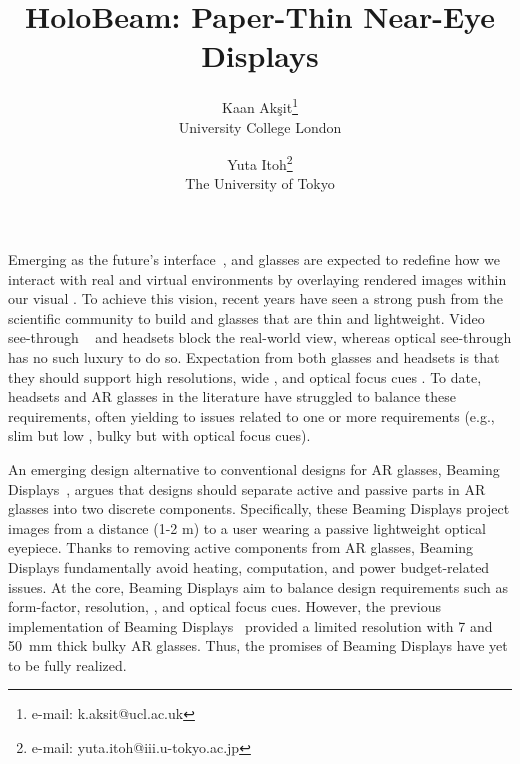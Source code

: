 \documentclass{vgtc}                          %
\title{HoloBeam: Paper-Thin Near-Eye Displays}
\author{Kaan Akşit\thanks{e-mail: k.aksit@ucl.ac.uk}\\ %
        \scriptsize University College London %
\and Yuta Itoh\thanks{e-mail: yuta.itoh@iii.u-tokyo.ac.jp}\\ %
     \scriptsize The University of Tokyo %
}
\begin{document}
\label{sec:introduction}

\maketitle
Emerging as the future's interface~\cite{orlosky2021telelife}, \VR and \AR glasses are expected to redefine how we interact with real and virtual environments by overlaying rendered images within our visual \FoV.
To achieve this vision, recent years have seen a strong push from the scientific community to build \AR \cite{maimone2017holographic, maimone2014pinlight} and \VR \cite{ratcliff2020thinvr,kim2022holographicglasses} glasses that are thin and lightweight.
Video see-through \AR~\cite{ebner2022video} and \VR headsets block the real-world view, whereas optical see-through \AR has no such luxury to do so.
Expectation from both \AR glasses and \VR headsets is that they should support high resolutions, wide \FoV, and optical focus cues \cite{aghasi2021optimal}.
To date, \VR headsets and AR glasses in the literature have struggled to balance these requirements, often yielding to issues related to one or more requirements (e.g., slim but low \FoV, bulky but with optical focus cues).


An emerging design alternative to conventional designs for AR glasses, Beaming Displays~\cite{itoh2021beaming}, argues that designs should separate active and passive parts in AR glasses into two discrete components.
Specifically, these Beaming Displays project images from a distance (1-2 m) to a user wearing a passive lightweight optical eyepiece.
Thanks to removing active components from AR glasses, Beaming Displays fundamentally avoid heating, computation, and power budget-related issues.
At the core, Beaming Displays aim to balance design requirements such as form-factor, resolution, \FoV, and optical focus cues.
However, the previous implementation of Beaming Displays~\cite{itoh2021beaming} provided a limited resolution with 7 \cpd and 50~mm thick bulky AR glasses.
Thus, the promises of Beaming Displays have yet to be fully realized.
\end{document}
